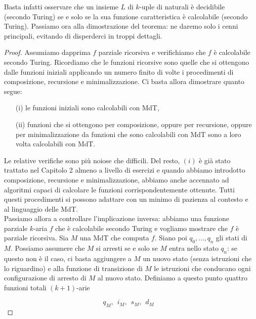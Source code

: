 Basta infatti osservare che un insieme $L$ di $k$-uple di naturali è decidibile
(secondo Turing) se e solo se la sua funzione caratteristica è calcolabile
(secondo Turing). Passiamo ora alla dimostrazione del teorema: ne daremo solo i
cenni principali, evitando di disperderci in troppi dettagli.

\begin{proof}
    Assumiamo dapprima $f$ parziale ricorsiva e verifichiamo che $f$
    è calcolabile secondo Turing. Ricordiamo che le funzioni ricorsive sono quelle
    che si ottengono dalle funzioni iniziali applicando un numero finito di volte
    $\mathrm{i}$ procedimenti di composizione, recursione e minimalizzazione. Ci
    basta allora dimostrare quanto segue:

    \begin{enumerate}
        \item[(i)] le funzioni iniziali sono calcolabili
            con MdT,
        \item[(ii)] funzioni che si ottengono per composizione, oppure per recursione,
            oppure per minimalizzazione da funzioni che sono calcolabili con MdT sono a loro
            volta calcolabili con MdT.
    \end{enumerate}

    Le relative verifiche sono più noiose che difficili. Del resto, $(i)$ è già
    stato trattato nel Capitolo 2 almeno a livello di esercizi e quando abbiamo
    introdotto composizione, recursione e minimalizzazione, abbiamo anche accennato
    ad algoritmi capaci di calcolare le funzioni corrispondentemente ottenute. Tutti questi
    procedimenti si possono adattare con un minimo di pazienza al contesto e al
    linguaggio delle MdT.\\

    Passiamo allora a controllare l'implicazione inversa: abbiamo una funzione
    parziale $k$-aria $f$ che è calcolabile secondo Turing e vogliamo mostrare
    che $f$ è parziale ricorsiva. Sia $M$ una MdT che computa $f$. Siano poi
    $q_0, \ldots, q_n$ gli stati di $M$. Possiamo assumere che $M$ si arresti se
    e solo se $M$ entra nello stato $q_n$: se questo non è il caso, ci basta
    aggiungere a $M$ un nuovo stato (senza istruzioni che lo riguardino) e alla
    funzione di transizione di $M$ le istruzioni che conducano ogni
    configurazione di arresto di $M$ al nuovo stato. Definiamo a questo punto
    quattro funzioni totali $(k+1)$-arie

    $$
        q_M, \ \ i_M, \ \ s_M, \ \ d_M
    $$


\end{proof}
